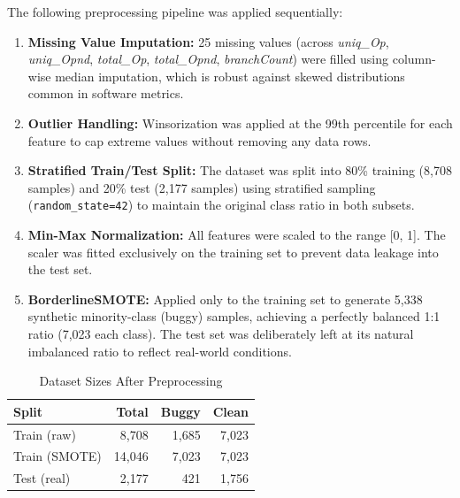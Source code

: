 \documentclass[12pt,a4paper]{article}
\begin{document}
The following preprocessing pipeline was applied sequentially:

\begin{enumerate}[leftmargin=1.5cm]
  \item \textbf{Missing Value Imputation:} 25 missing values (across
    \textit{uniq\_Op}, \textit{uniq\_Opnd}, \textit{total\_Op},
    \textit{total\_Opnd}, \textit{branchCount}) were filled using
    column-wise median imputation, which is robust against skewed
    distributions common in software metrics.

  \item \textbf{Outlier Handling:} Winsorization was applied at the
    99th percentile for each feature to cap extreme values without
    removing any data rows.

  \item \textbf{Stratified Train/Test Split:} The dataset was split
    into 80\% training (8,708 samples) and 20\% test (2,177 samples)
    using stratified sampling (\texttt{random\_state=42}) to maintain
    the original class ratio in both subsets.

  \item \textbf{Min-Max Normalization:} All features were scaled to
    the range [0, 1]. The scaler was fitted exclusively on the training
    set to prevent data leakage into the test set.

  \item \textbf{BorderlineSMOTE:} Applied only to the training set to
    generate 5,338 synthetic minority-class (buggy) samples, achieving
    a perfectly balanced 1:1 ratio (7,023 each class). The test set
    was deliberately left at its natural imbalanced ratio to reflect
    real-world conditions.
\end{enumerate}

\begin{table}[H]
  \centering
  \caption{Dataset Sizes After Preprocessing}
  \begin{tabular}{lrrr}
    \toprule
    \textbf{Split} & \textbf{Total} & \textbf{Buggy} & \textbf{Clean} \\
    \midrule
    Train (raw)    & 8,708  & 1,685 & 7,023 \\
    Train (SMOTE)  & 14,046 & 7,023 & 7,023 \\
    Test (real)    & 2,177  & 421   & 1,756 \\
    \bottomrule
  \end{tabular}
\end{table}
\end{document}
